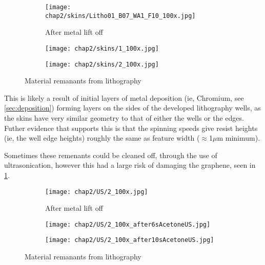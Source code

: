 \documentclass[../../Matt_Gebert_Honours_Thesis.tex]{subfiles}
\begin{document}
	\begin{figure}[H]
		\centering
		\begin{subfigure}[b]{0.3\textwidth}
			\texttt{[image: chap2/skins/Litho01\_B07\_WA1\_F10\_100x.jpg]}
			\caption{After metal lift off}			
		\end{subfigure}
		\begin{subfigure}[b]{0.3\textwidth}
			\texttt{[image: chap2/skins/1\_100x.jpg]}
		\end{subfigure}
		\begin{subfigure}[b]{0.3\textwidth}
			\texttt{[image: chap2/skins/2\_100x.jpg]}
		\end{subfigure}
		\caption{Material remanants from lithography}\label{fig:lithography_skins}
	\end{figure}
	
	This is likely a result of initial layers of metal deposition (ie, Chromium, see \cref{sec:deposition}) forming layers on the sides of the developed lithography wells, as the skins have very similar geometry to that of either the wells or the edges. Futher evidence that supports this is that the spinning speeds give resist heights (ie, the well edge heights) roughly the same as feature width ($\approx$1$\mu$m minimum).
	
	Sometimes these remenants could be cleaned off, through the use of ultrasonication, however this had a large risk of damaging the graphene, seen in \cref{fig:lithography_skins}.
	
	
	\begin{figure}[H]
		\centering
		\begin{subfigure}[b]{0.3\textwidth}
			\texttt{[image: chap2/US/2\_100x.jpg]}
			\caption{After metal lift off}			
		\end{subfigure}
		\begin{subfigure}[b]{0.3\textwidth}
			\texttt{[image: chap2/US/2\_100x\_after6sAcetoneUS.jpg]}
		\end{subfigure}
		\begin{subfigure}[b]{0.3\textwidth}
			\texttt{[image: chap2/US/2\_100x\_after10sAcetoneUS.jpg]}
		\end{subfigure}
		\caption{Material remanants from lithography}\label{fig:lithography_skins_us}
	\end{figure}
	
\end{document}
